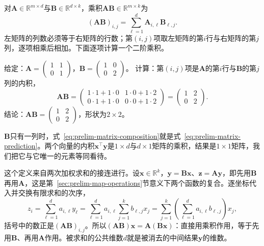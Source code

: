 对$\bm A\in\mathbb R^{m\times d}$与$\bm B\in\mathbb R^{d\times k}$，乘积$\bm A\bm B\in\mathbb R^{m\times k}$为
\begin{equation}
 (\bm A\bm B)_{i,j}=\sum_{\ell=1}^d\bm A_{i,\ell}\bm B_{\ell,j}.
 \label{eq:prelim-matrix-composition}
\end{equation}
左矩阵的列数必须等于右矩阵的行数；第$(i,j)$项取左矩阵的第$i$行与右矩阵的第$j$列，逐项相乘后相加。下面逐项计算一个二阶乘积。
\begin{example}[二阶矩阵的乘积]
\label{ex:ls-matrix-product-2x2}
给定：$\bm A=\left(\begin{smallmatrix}1&1\\0&1\end{smallmatrix}\right)$，$\bm B=\left(\begin{smallmatrix}1&0\\0&2\end{smallmatrix}\right)$。
计算：第$(i,j)$项是$\bm A$的第$i$行与$\bm B$的第$j$列的内积，
\[
 \bm A\bm B
 =\begin{pmatrix}1\cdot1+1\cdot0&1\cdot0+1\cdot2\\0\cdot1+1\cdot0&0\cdot0+1\cdot2\end{pmatrix}
 =\begin{pmatrix}1&2\\0&2\end{pmatrix}.
\]
结论：$\bm A\bm B=\left(\begin{smallmatrix}1&2\\0&2\end{smallmatrix}\right)$，形状为$2\times2$。
\end{example}
$\bm B$只有一列时，式~\eqref{eq:prelim-matrix-composition}就是式~\eqref{eq:prelim-matrix-prediction}。两个向量的内积$\bm x^\top\bm y$是$1\times d$与$d\times1$矩阵的乘积，结果是$1\times1$矩阵，我们把它与它唯一的元素等同看待。

这个定义来自两次加权求和的接连进行。设$\bm x\in\mathbb R^k$，$\bm y=\bm B\bm x$、$\bm z=\bm A\bm y$，即先用$\bm B$再用$\bm A$，这是第~\ref{sec:prelim-map-operations}节意义下两个函数的复合。逐坐标代入并交换有限求和的次序，
\begin{equation}
 z_i=\sum_{\ell=1}^d a_{i,\ell}y_\ell
 =\sum_{\ell=1}^d a_{i,\ell}\sum_{j=1}^k b_{\ell,j}x_j
 =\sum_{j=1}^k\left(\sum_{\ell=1}^d a_{i,\ell}b_{\ell,j}\right)x_j,
 \label{eq:linear-algebra-matrix-product}
\end{equation}
括号中的数正是$(\bm A\bm B)_{i,j}$。所以$(\bm A\bm B)\bm x=\bm A(\bm B\bm x)$：直接用乘积作用，等于先用$\bm B$、再用$\bm A$作用。被求和的公共维数$d$就是被消去的中间结果$\bm y$的维数。

